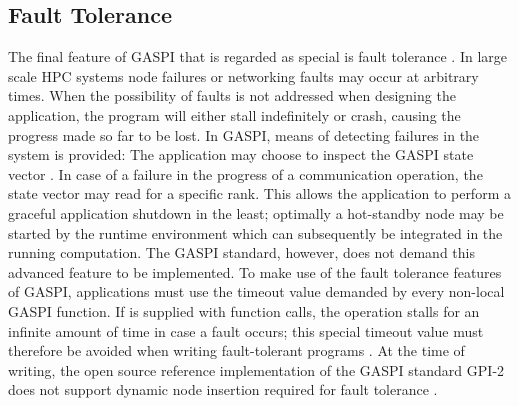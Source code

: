 \subsection{Fault Tolerance}
\label{ssec:background:gaspi:fault-tolerance}
The final feature of \ac{GASPI} that is regarded as special is fault tolerance \cite[ch.~8.2]{gaspi-sum}. In large scale \ac{HPC} systems node failures or networking faults may occur at arbitrary times. When the possibility of faults is not addressed when designing the application, the program will either stall indefinitely or crash, causing the progress made so far to be lost. In \ac{GASPI}, means of detecting failures in the system is provided: The application may choose to inspect the \ac{GASPI} state vector \cite[ch.~5.5]{gaspi-std}. In case of a failure in the progress of a communication operation, the state vector may read  for a specific rank. This allows the application to perform a graceful application shutdown in the least; optimally a hot-standby node may be started by the runtime environment which can subsequently be integrated in the running computation. The \ac{GASPI} standard, however, does not demand this advanced feature to be implemented. To make use of the fault tolerance features of \ac{GASPI}, applications must use the timeout value demanded by every non-local \ac{GASPI} function. If  is supplied with function calls, the operation stalls for an infinite amount of time in case a fault occurs; this special timeout value must therefore be avoided when writing fault-tolerant programs \cite[ch.~3.9]{gaspi-std}. At the time of writing, the open source reference implementation of the \ac{GASPI} standard \acs{GPI}-2 does not support dynamic node insertion required for fault tolerance \cite{gpi-2-github}.
